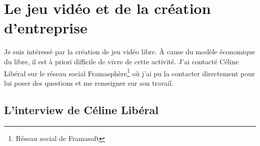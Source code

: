 \documentclass[a4paper,12pt, draft]{report}
\begin{document}
\section{Le jeu vidéo et de la création d'entreprise}
Je suis intéressé par la création de jeu vidéo libre. À cause du modèle économique du libre, il est à priori difficile de vivre de cette activité. J'ai contacté Céline Libéral sur le réseau social Framasphère\footnote{Réseau social de Framasoft} où j'ai pu la contacter directement pour lui poser des questions et me renseigner sur son travail.


\subsection{L'interview de Céline Libéral}
\begin{description}


\end{description}
\end{document}
